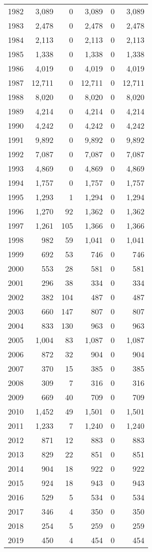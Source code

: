 \documentclass[11pt]{book}
\begin{document}
\begin{longtable}[]{@{}lrrrrr@{}}
1982 & 3,089 & 0 & 3,089 & 0 & 3,089\tabularnewline
1983 & 2,478 & 0 & 2,478 & 0 & 2,478\tabularnewline
1984 & 2,113 & 0 & 2,113 & 0 & 2,113\tabularnewline
1985 & 1,338 & 0 & 1,338 & 0 & 1,338\tabularnewline
1986 & 4,019 & 0 & 4,019 & 0 & 4,019\tabularnewline
1987 & 12,711 & 0 & 12,711 & 0 & 12,711\tabularnewline
1988 & 8,020 & 0 & 8,020 & 0 & 8,020\tabularnewline
1989 & 4,214 & 0 & 4,214 & 0 & 4,214\tabularnewline
1990 & 4,242 & 0 & 4,242 & 0 & 4,242\tabularnewline
1991 & 9,892 & 0 & 9,892 & 0 & 9,892\tabularnewline
1992 & 7,087 & 0 & 7,087 & 0 & 7,087\tabularnewline
1993 & 4,869 & 0 & 4,869 & 0 & 4,869\tabularnewline
1994 & 1,757 & 0 & 1,757 & 0 & 1,757\tabularnewline
1995 & 1,293 & 1 & 1,294 & 0 & 1,294\tabularnewline
1996 & 1,270 & 92 & 1,362 & 0 & 1,362\tabularnewline
1997 & 1,261 & 105 & 1,366 & 0 & 1,366\tabularnewline
1998 & 982 & 59 & 1,041 & 0 & 1,041\tabularnewline
1999 & 692 & 53 & 746 & 0 & 746\tabularnewline
2000 & 553 & 28 & 581 & 0 & 581\tabularnewline
2001 & 296 & 38 & 334 & 0 & 334\tabularnewline
2002 & 382 & 104 & 487 & 0 & 487\tabularnewline
2003 & 660 & 147 & 807 & 0 & 807\tabularnewline
2004 & 833 & 130 & 963 & 0 & 963\tabularnewline
2005 & 1,004 & 83 & 1,087 & 0 & 1,087\tabularnewline
2006 & 872 & 32 & 904 & 0 & 904\tabularnewline
2007 & 370 & 15 & 385 & 0 & 385\tabularnewline
2008 & 309 & 7 & 316 & 0 & 316\tabularnewline
2009 & 669 & 40 & 709 & 0 & 709\tabularnewline
2010 & 1,452 & 49 & 1,501 & 0 & 1,501\tabularnewline
2011 & 1,233 & 7 & 1,240 & 0 & 1,240\tabularnewline
2012 & 871 & 12 & 883 & 0 & 883\tabularnewline
2013 & 829 & 22 & 851 & 0 & 851\tabularnewline
2014 & 904 & 18 & 922 & 0 & 922\tabularnewline
2015 & 924 & 18 & 943 & 0 & 943\tabularnewline
2016 & 529 & 5 & 534 & 0 & 534\tabularnewline
2017 & 346 & 4 & 350 & 0 & 350\tabularnewline
2018 & 254 & 5 & 259 & 0 & 259\tabularnewline
2019 & 450 & 4 & 454 & 0 & 454\tabularnewline
\bottomrule
\end{longtable}
\clearpage
\end{document}
